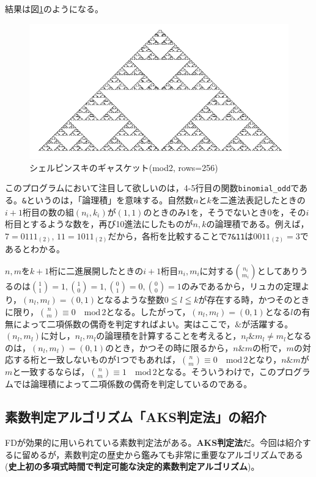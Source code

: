 結果は図\ref{sierp_2_and}のようになる。
\begin{figure}[ht]
    \centering
        \includegraphics[scale=0.5]{Figure_using_and.png}
    \caption{シェルピンスキのギャスケット(mod2, rows=256)}
    \label{sierp_2_and}
\end{figure}

このプログラムにおいて注目して欲しいのは，4-5行目の関数\texttt{binomial\_odd}である。\texttt{\&}というのは，「論理積」を意味する。自然数$n$と$k$を二進法表記したときの$i+1$桁目の数の組$(n_i,k_i)$が$(1,1)$のときのみ1を，そうでないとき0を，その$i$桁目とするような数を，再び10進法にしたものが$n,k$の論理積である。例えば，$7=0111{}_{(2)},\,11=1011{}_{(2)}$だから，各桁を比較することで\texttt{7\&11}は$0011{}_{(2)}=3$であるとわかる。

$n,m$を$k+1$桁に二進展開したときの$i+1$桁目$n_i,m_i$に対する$\binom{n_i}{m_i}$としてありうるのは$\binom{1}{1}=1,\binom{1}{0}=1,\binom{0}{1}=0,\binom{0}{0}=1$のみであるから，リュカの定理より，$(n_l,m_l)=(0,1)$となるような整数$0\leqq l \leqq k$が存在する時，かつそのときに限り，$\binom{n}{m}\equiv 0 \quad \mathrm{mod}\,2$となる。したがって，$(n_l,m_l)=(0,1)$となる$l$の有無によって二項係数の偶奇を判定すればよい。実はここで，$\mathtt{\&}$が活躍する。$(n_l,m_l)$に対し，$n_l,m_l$の論理積を計算することを考えると，$n_l\mathtt{\&}m_l\ne m_l$となるのは，$(n_l,m_l)=(0,1)$のとき，かつその時に限るから，$n\mathtt{\&}m$の桁で，$m$の対応する桁と一致しないものが1つでもあれば，$\binom{n}{m}\equiv 0\quad \mathrm{mod}\,2$となり，$n\mathtt{\&}m$が$m$と一致するならば，$\binom{n}{m}\equiv 1\quad\mathrm{mod}\,2$となる。そういうわけで，このプログラムでは論理積によって二項係数の偶奇を判定しているのである。

\subsection{素数判定アルゴリズム「AKS判定法」の紹介}
\textsf{FD}が効果的に用いられている素数判定法がある。\textbf{AKS判定法}だ。今回は紹介するに留めるが，素数判定の歴史から鑑みても非常に重要なアルゴリズムである(\textbf{史上初の多項式時間で判定可能な決定的素数判定アルゴリズム})。


